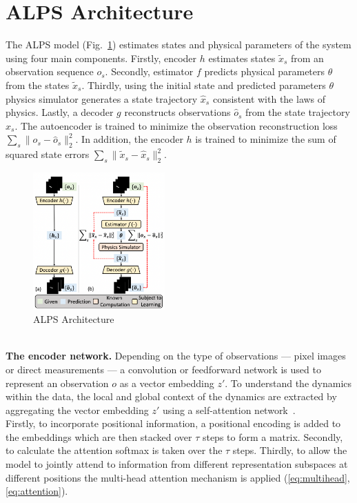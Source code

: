 \documentclass[acmtog]{techreportacmart}
\begin{document}
\section{ALPS Architecture}
The ALPS model (Fig.~\ref{fig:architecture}) estimates states and physical parameters of the system using four main components. Firstly, encoder ${h}$ estimates states $\tilde{x}_{s}$ from an observation sequence ${o_s}$. Secondly, estimator ${f}$ predicts physical parameters ${\theta}$  from the states $\tilde{x}_{s}$. Thirdly, using the initial state and predicted parameters ${\theta}$ physics simulator generates a state trajectory $\hat{x}_{s}$ consistent with the laws of physics. Lastly, a decoder ${g}$ reconstructs observations $\hat{o}_{s}$ from the state trajectory $\hat{x}_{s}$. The autoencoder is trained to minimize the observation reconstruction loss $\sum_{s} \lVert o_{s} - \hat{o}_{s} \rVert_{2}^{2}$. In addition, the encoder ${h}$ is trained to minimize the sum of squared state errors $\sum_{s} \lVert \tilde{x}_{s} - \hat{x}_{s} \rVert_{2}^{2}$.
\begin{figure}
  \centering
  \includegraphics[width=0.45\textwidth]{architecture}
  \caption{ALPS Architecture}
  \label{fig:architecture}
\end{figure}
\\
\textbf{The encoder network.} Depending on the type of observations --- pixel images or direct measurements --- a convolution or feedforward network is used to represent an observation ${o}$ as a vector embedding ${z'}$. To understand the dynamics within the data, the local and global context of the dynamics are extracted by aggregating the vector embedding ${z'}$ using a self-attention network~\cite{NIPS2017_3f5ee243}.
\\
Firstly, to incorporate positional information, a positional encoding is added to the embeddings which are then stacked over ${\tau}$ steps to form a matrix. Secondly, to calculate the attention softmax is taken over the ${\tau}$ steps. Thirdly, to allow the model to jointly attend to information from different representation subspaces at different positions the multi-head attention mechanism is applied (\ref{eq:multihead},\ref{eq:attention}).
\end{document}
